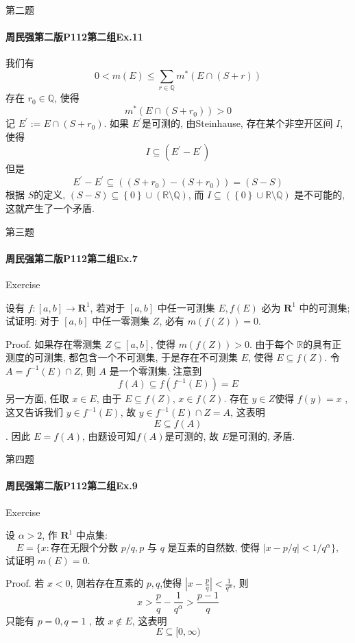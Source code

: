 \documentclass{beamer}
\begin{document}
\begin{frame}[fragile]{第二题}
\framesubtitle{周民强第二版P112第二组Ex.11}
我们有 \[
    0< m\left( E \right)\le \sum _{r \in \mathbb{Q} }m^{*}\left( E\cap \left( S+ r \right)  \right)  
    \]存在 \(  r_0\in \mathbb{Q}   \), 使得 \[
    m^{*}\left( E\cap \left( S+ r_0 \right)  \right)> 0 
    \] 记 \(  E^{\prime} := E\cap \left( S+ r_0 \right)   \). 如果 \(  E^{\prime}   \)是可测的, 由Steinhause, 存在某个非空开区间 \(  I  \), 使得 \[
    I\subseteq \left( E^{\prime} -E^{\prime}  \right) 
    \]   但是 \[
    E^{\prime} -E^{\prime} \subseteq \left( \left( S+ r_0 \right)-\left( S+ r_0 \right)   \right)=\left( S- S \right) 
    \]根据 \(  S  \)的定义, \(  \left( S-S \right)\subseteq \left\{ 0 \right\}\cup \left( \mathbb{R} \setminus \mathbb{Q}  \right)    \), 而 \(  I\subseteq \left( \left\{ 0 \right\}\cup \mathbb{R} \setminus \mathbb{Q}  \right)   \)  是不可能的, 这就产生了一个矛盾.
\end{frame}
\begin{frame}[fragile]{第三题}
\framesubtitle{周民强第二版P112第二组Ex.7 }

\begin{block}{Exercise}

设有 $f:[a,b] \to \mathbf{R}^1$, 若对于 $[a,b]$ 中任一可测集 $E, f(E)$ 必为 $\mathbf{R}^1$ 中的可测集; 试证明: 对于 $[a,b]$ 中任一零测集 $Z$, 必有 $m(f(Z)) = 0$.
\end{block}

Proof. 
 如果存在零测集 \(  Z  \subseteq \left[ a,b \right] \), 使得 \(  m\left( f\left( Z \right)  \right)> 0   \). 由于每个 \(  \mathbb{R}   \)的具有正测度的可测集, 都包含一个不可测集, 于是存在不可测集 \(  E  \), 使得 \(  E\subseteq f\left( Z \right)   \). 令 \(  A= f^{-1} \left( E \right)\cap Z   \), 则 \(  A  \)    是一个零测集. 注意到 \[
    f\left( A \right)\subseteq f\left( f^{-1} \left( E \right)  \right)= E  
    \] 另一方面, 任取 \(  x\in E  \), 由于 \(  E\subseteq f\left( Z \right)   \), \(  x \in f\left( Z \right)   \).  存在 \(  y \in Z  \)使得 \(  f\left( y \right)= x   \)    , 这又告诉我们 \(  y \in f^{-1} \left( E \right)   \), 故 \(  y \in f^{-1} \left( E \right)\cap Z= A   \),   这表明 \[
    E\subseteq f\left( A \right) 
    \]  . 因此 \(  E= f\left( A \right)   \), 由题设可知\(  f\left( A \right)   \)是可测的, 故 \(  E  \)是可测的, 矛盾.   
\end{frame}


\begin{frame}[fragile]{第四题}
\framesubtitle{周民强第二版P112第二组Ex.9 }

\begin{block}{Exercise}

设 $\alpha>2$, 作 $\mathbf{R}^1$ 中点集:
\[
E = \{x: \text{存在无限个分数 } p/q, p \text{ 与 } q \text{ 是互素的自然数, 使得 } |x - p/q| < 1/q^\alpha\},
\]
试证明 $m(E)=0$.
\end{block}
Proof.  若 \(  x< 0  \), 则若存在互素的 \(  p,q  \),使得 \(  \left| x-\frac{p }{q }  \right|< \frac{1 }{q^{\alpha } }    \), 则 \[
    x> \frac{p }{q }-\frac{1 }{q^{\alpha } }> \frac{p-1 }{q }   
    \]只能有 \(  p = 0, q=  1  \)     , 故 \(  x\not \in E  \), 这表明 \[
    E\subseteq [0,\infty)
    \] 
\end{frame}
\end{document}
